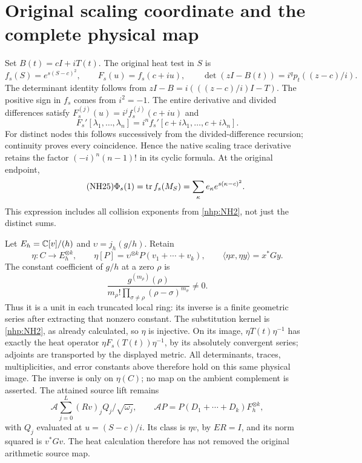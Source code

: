 \documentclass[11pt]{article}
\begin{document}
\section{Original scaling coordinate and the complete physical map}

Set \(B(t)=cI+iT(t)\). The original heat test in \(S\) is
\begin{equation}\tag{NH24}\label{nhp:NH24}
f_s(S)=e^{s(S-c)^2},\qquad
F_s(u)=f_s(c+iu),\qquad
\det(zI-B(t))=i^q p_t((z-c)/i).
\end{equation}
The determinant identity follows from
\(zI-B=i(((z-c)/i)I-T)\).
The positive sign in \(f_s\) comes from \(i^2=-1\).
The entire derivative and divided differences satisfy
\(F_s^{(j)}(u)=i^j f_s^{(j)}(c+iu)\) and
\[
F_s'[\lambda_1,\ldots,\lambda_n]
=i^n f_s'[c+i\lambda_1,\ldots,c+i\lambda_n].
\]
For distinct nodes this follows successively from the
divided-difference recursion; continuity proves every
coincidence. Hence the native scaling trace derivative
retains the factor \((-i)^n(n-1)!\) in its cyclic formula.
At the original endpoint,
\begin{equation}\tag{NH25}\label{nhp:NH25}
\Phi_s(1)=\operatorname{tr} f_s(M_S)
=\sum_\kappa e_\kappa e^{s(\kappa-c)^2}.
\end{equation}
This expression includes all collision exponents from
\eqref{nhp:NH2}, not just the distinct sums.

Let \(E_h=\mathbb C[v]/(h)\) and
\(\upsilon=j_h(g/h)\). Retain
\begin{equation}\tag{NH26}\label{nhp:NH26}
\eta:C\longrightarrow E_h^{\otimes k},\qquad
\eta[P]=\upsilon^{\otimes k}P(v_1+\cdots+v_k),\qquad
\langle\eta x,\eta y\rangle=x^*Gy.
\end{equation}
The constant coefficient of \(g/h\) at a zero \(\rho\) is
\[
\frac{g^{(m_\rho)}(\rho)}
 {m_\rho!\prod_{\sigma\ne\rho}(\rho-\sigma)^{m_\sigma}}\ne0 .
\]
Thus it is a unit in each truncated local ring: its
inverse is a finite geometric series after extracting
that nonzero constant. The substitution kernel is
\eqref{nhp:NH2}, as already calculated, so \(\eta\) is injective.
On its image, \(\eta T(t)\eta^{-1}\) has exactly the
heat operator \(\eta F_s(T(t))\eta^{-1}\), by its
absolutely convergent series; adjoints are transported
by the displayed metric. All determinants, traces,
multiplicities, and error constants above therefore
hold on this same physical image. The inverse is only
on \(\eta(C)\); no map on the ambient complement is asserted.
The attained source lift remains
\[
\mathcal A\sum_{j=0}^L(Rv)_jQ_j/\sqrt{\omega_j},
\qquad
\mathcal A P=P(D_1+\cdots+D_k)F_h^{\otimes k},
\]
with \(Q_j\) evaluated at \(u=(S-c)/i\).
Its class is \(\eta v\), by \(ER=I\), and its norm
squared is \(v^*Gv\). The heat calculation therefore
has not removed the original arithmetic source map.
\end{document}

